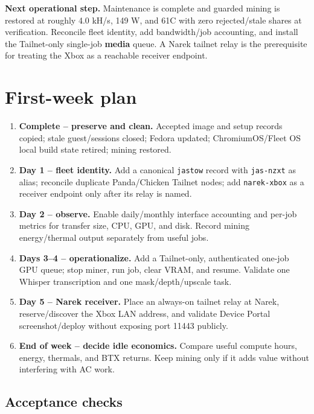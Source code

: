 \documentclass[11pt,letterpaper]{article}
\newcommand{\mono}[1]{\texttt{#1}}
\begin{document}
\begin{notebox}
\textbf{Next operational step.} Maintenance is complete and guarded mining is restored at roughly 4.0 kH/s, 149 W, and 61\textdegree C with zero rejected/stale shares at verification. Reconcile fleet identity, add bandwidth/job accounting, and install the Tailnet-only single-job \textbf{media} queue. A Narek tailnet relay is the prerequisite for treating the Xbox as a reachable receiver endpoint.
\end{notebox}

\begingroup
\small
\section{First-week plan}

\begin{enumerate}
  \item \textbf{Complete -- preserve and clean.} Accepted image and setup records copied; stale guest/sessions closed; Fedora updated; ChromiumOS/Fleet OS local build state retired; mining restored.
  \item \textbf{Day 1 -- fleet identity.} Add a canonical \mono{jastow} record with \mono{jas-nzxt} as alias; reconcile duplicate Panda/Chicken Tailnet nodes; add \mono{narek-xbox} as a receiver endpoint only after its relay is named.
  \item \textbf{Day 2 -- observe.} Enable daily/monthly interface accounting and per-job metrics for transfer size, CPU, GPU, and disk. Record mining energy/thermal output separately from useful jobs.
  \item \textbf{Days 3--4 -- operationalize.} Add a Tailnet-only, authenticated one-job GPU queue; stop miner, run job, clear VRAM, and resume. Validate one Whisper transcription and one mask/depth/upscale task.
  \item \textbf{Day 5 -- Narek receiver.} Place an always-on tailnet relay at Narek, reserve/discover the Xbox LAN address, and validate Device Portal screenshot/deploy without exposing port 11443 publicly.
  \item \textbf{End of week -- decide idle economics.} Compare useful compute hours, energy, thermals, and BTX returns. Keep mining only if it adds value without interfering with AC work.
\end{enumerate}

\subsection{Acceptance checks}
\end{document}
